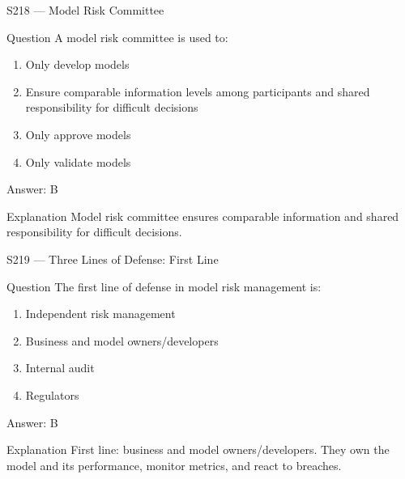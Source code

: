 \documentclass[aspectratio=169,8pt]{beamer}
\begin{document}
	\begin{frame}{S218 --- Model Risk Committee}
		\begin{block}{Question}
			A model risk committee is used to:
			\begin{enumerate}
				\item Only develop models
				\item Ensure comparable information levels among participants and shared responsibility for difficult decisions
				\item Only approve models
				\item Only validate models
			\end{enumerate}
		\end{block}
		\begin{exampleblock}{Answer: B}\end{exampleblock}
		\begin{block}{Explanation}
			Model risk committee ensures comparable information and shared responsibility for difficult decisions.
		\end{block}
	\end{frame}
	
	\begin{frame}{S219 --- Three Lines of Defense: First Line}
		\begin{block}{Question}
			The first line of defense in model risk management is:
			\begin{enumerate}
				\item Independent risk management
				\item Business and model owners/developers
				\item Internal audit
				\item Regulators
			\end{enumerate}
		\end{block}
		\begin{exampleblock}{Answer: B}\end{exampleblock}
		\begin{block}{Explanation}
			First line: business and model owners/developers. They own the model and its performance, monitor metrics, and react to breaches.
		\end{block}
	\end{frame}
	
\end{document}

